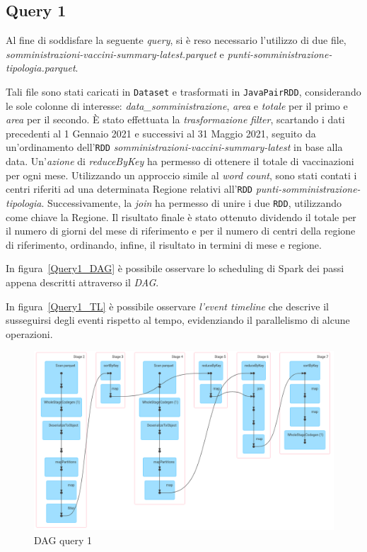 \documentclass[conference]{IEEEtran}
\begin{document}
\subsection*{\textbf{Query 1}}
Al fine di soddisfare la seguente \emph{query}, si \`{e} reso necessario l'utilizzo di due file, \textit{somministrazioni-vaccini-summary-latest.parquet} e \textit{punti-somministrazione-tipologia.parquet}. \par
Tali file sono stati caricati in \texttt{Dataset} e trasformati in \texttt{JavaPairRDD}, considerando le sole colonne di interesse: \emph{data\_somministrazione}, \emph{area} e \emph{totale} per il primo e \emph{area} per il secondo. \`{E} stato effettuata la \emph{trasformazione} \emph{filter}, scartando i dati precedenti al 1 Gennaio 2021 e successivi al 31 Maggio 2021, seguito da un'ordinamento dell'\texttt{RDD} \textit{somministrazioni-vaccini-summary-latest} in base alla data. Un'\emph{azione} di \emph{reduceByKey} ha permesso di ottenere il totale di vaccinazioni per ogni mese. Utilizzando un approccio simile al \emph{word count}, sono stati contati i centri riferiti ad una determinata Regione relativi all'\texttt{RDD} \textit{punti-somministrazione-tipologia}. Successivamente, la \emph{join} ha permesso di unire i due \texttt{RDD}, utilizzando come chiave la Regione. Il risultato finale \`{e} stato ottenuto dividendo il totale per il numero di giorni del mese di riferimento e per il numero di centri della regione di riferimento, ordinando, infine, il risultato in termini di mese e regione.
\par In figura~\ref{Query1_DAG} \`{e} possibile osservare lo scheduling di Spark dei passi appena descritti attraverso il \emph{DAG}.\par In figura~\ref{Query1_TL} \`{e} possibile osservare \emph{l'event timeline} che descrive il susseguirsi degli eventi rispetto al tempo, evidenziando il parallelismo di alcune operazioni. 
\begin{figure}[htbp]
\includegraphics[scale=0.20]{Screenshot/Query1_DAG.png}
\caption{DAG query 1}\label{Query1_DAG}
\label{fig}
\end{figure}
\end{document}
